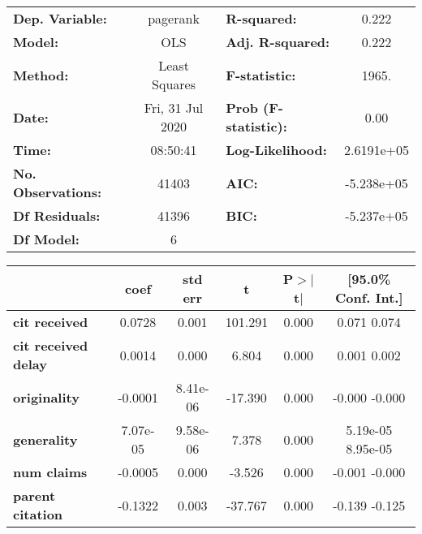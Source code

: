 \begin{center}
\begin{tabular}{lclc}
\toprule
\textbf{Dep. Variable:}     &     pagerank     & \textbf{  R-squared:         } &       0.222     \\
\textbf{Model:}             &       OLS        & \textbf{  Adj. R-squared:    } &       0.222     \\
\textbf{Method:}            &  Least Squares   & \textbf{  F-statistic:       } &       1965.     \\
\textbf{Date:}              & Fri, 31 Jul 2020 & \textbf{  Prob (F-statistic):} &       0.00      \\
\textbf{Time:}              &     08:50:41     & \textbf{  Log-Likelihood:    } &   2.6191e+05    \\
\textbf{No. Observations:}  &       41403      & \textbf{  AIC:               } &   -5.238e+05    \\
\textbf{Df Residuals:}      &       41396      & \textbf{  BIC:               } &   -5.237e+05    \\
\textbf{Df Model:}          &           6      & \textbf{                     } &                 \\
\bottomrule
\end{tabular}
\begin{tabular}{lccccc}
                            & \textbf{coef} & \textbf{std err} & \textbf{t} & \textbf{P$>$$|$t$|$} & \textbf{[95.0\% Conf. Int.]}  \\
\midrule
\textbf{cit received}       &       0.0728  &        0.001     &   101.291  &         0.000        &         0.071     0.074       \\
\textbf{cit received delay} &       0.0014  &        0.000     &     6.804  &         0.000        &         0.001     0.002       \\
\textbf{originality}        &      -0.0001  &     8.41e-06     &   -17.390  &         0.000        &        -0.000    -0.000       \\
\textbf{generality}         &     7.07e-05  &     9.58e-06     &     7.378  &         0.000        &      5.19e-05  8.95e-05       \\
\textbf{num claims}         &      -0.0005  &        0.000     &    -3.526  &         0.000        &        -0.001    -0.000       \\
\textbf{parent citation}    &      -0.1322  &        0.003     &   -37.767  &         0.000        &        -0.139    -0.125       \\

\end{tabular}
\end{center}
